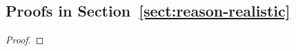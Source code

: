 \subsection{Proofs in Section~\ref{sect:reason-realistic}}
\label{sect:label-noise-proof-realistic}

\begin{proof}




\end{proof}


